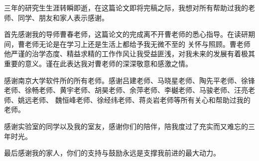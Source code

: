 \documentclass[master]{njuthesis}
\begin{document}
\begin{acknowledgement}
  三年的研究生生涯转瞬即逝，在这篇论文即将完稿之际，我想对所有帮助过我的老师、同学、朋友和家人表示感谢。

  首先感谢我的导师曹春老师，这篇论文的完成离不开曹老师的悉心指导。在读研期间，曹老师无论是在学习上还是生活上都给予我无微不至的
  关怀与照顾。曹老师他严谨的治学态度、精益求精的工作作风让我受益匪浅，对我未来的发展有着极其重要的意义。谨在此表达我对曹老师的深深敬意和感激之情。

  感谢南京大学软件所的所有老师。感谢吕建老师、马晓星老师、陶先平老师、徐锋老师、徐畅老师、黄宇老师、胡昊老师、余萍老师、李樾老师、马骏老师、汪亮老师、姚远老师、
  魏恒峰老师、徐经纬老师、蒋炎岩老师等所有关心和帮助过我的老师。

  感谢实验室的同学以及我的室友，感谢你们的陪伴，陪我度过了充实而又难忘的三年时光。

  最后感谢我的家人，你们的支持与鼓励永远是支撑我前进的最大动力。
\end{acknowledgement}



\nocite{*}

%
%

\end{document}
